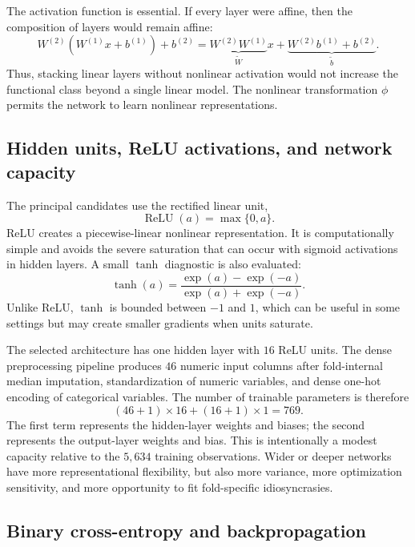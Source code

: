 The activation function is essential. If every layer were affine, then the composition of layers would remain affine:
\[
W^{(2)}(W^{(1)}x+b^{(1)})+b^{(2)}
=
\underbrace{W^{(2)}W^{(1)}}_{\widetilde{W}}x
+
\underbrace{W^{(2)}b^{(1)}+b^{(2)}}_{\widetilde{b}}.
\]
Thus, stacking linear layers without nonlinear activation would not increase the functional class beyond a single linear model. The nonlinear transformation \(\phi\) permits the network to learn nonlinear representations.

\subsection{Hidden units, ReLU activations, and network capacity}

The principal candidates use the rectified linear unit,
\[
\operatorname{ReLU}(a)
=
\max\{0,a\}.
\]
ReLU creates a piecewise-linear nonlinear representation. It is computationally simple and avoids the severe saturation that can occur with sigmoid activations in hidden layers. A small \(\tanh\) diagnostic is also evaluated:
\[
\tanh(a)
=
\frac{\exp(a)-\exp(-a)}{\exp(a)+\exp(-a)}.
\]
Unlike ReLU, \(\tanh\) is bounded between \(-1\) and \(1\), which can be useful in some settings but may create smaller gradients when units saturate.

The selected architecture has one hidden layer with \(16\) ReLU units. The dense preprocessing pipeline produces \(46\) numeric input columns after fold-internal median imputation, standardization of numeric variables, and dense one-hot encoding of categorical variables. The number of trainable parameters is therefore
\[
(46+1)\times16+(16+1)\times1=769.
\]
The first term represents the hidden-layer weights and biases; the second represents the output-layer weights and bias. This is intentionally a modest capacity relative to the \(5{,}634\) training observations. Wider or deeper networks have more representational flexibility, but also more variance, more optimization sensitivity, and more opportunity to fit fold-specific idiosyncrasies.

\subsection{Binary cross-entropy and backpropagation}

